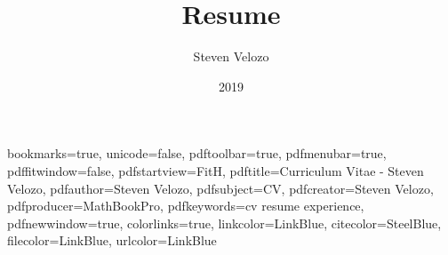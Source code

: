 
\usepackage{amsmath}

\usepackage{adjustbox}

\usepackage{graphicx}
\graphicspath{{graphics/}}

\title{Resume}
\author[Steven Velozo]{Steven Velozo}
\date{2019}
\newcommand{\displayaddress}{\marginnote[0.9cm]{\raggedleft{\href{mailto:steven@velozo.com}{steven@velozo.com}\\(206) 604-4981 }}}
\usepackage[english]{babel}
\usepackage{booktabs}
\usepackage{units}
\usepackage{fancyvrb}

\usepackage{multicol}

\usepackage{rotating}
\usepackage{tikz}
\usetikzlibrary{arrows,backgrounds,snakes}


\newcommand{\mhstandout}[1]{\textbf{\textcolor{DarkGray}{#1}}}
\newcommand{\shstandout}[1]{\textbf{\textcolor{BurntOrange}{#1}}}
\newcommand{\shyears}[1]{\small{\texttt{\textcolor{LightGray}{#1}}}}
\newcommand{\pstandout}[1]{\textcolor{BrightRed}{#1}}
\newcommand{\competency}[1]{\textcolor{BrightRed}{#1}}

\hypersetup
{
    bookmarks=true,         %
    unicode=false,          %
    pdftoolbar=true,        %
    pdfmenubar=true,        %
    pdffitwindow=false,     %
    pdfstartview={FitH},    %
    pdftitle={Curriculum Vitae - Steven Velozo},    %
    pdfauthor={Steven Velozo},     %
    pdfsubject={CV},   %
    pdfcreator={Steven Velozo},   %
    pdfproducer={MathBookPro}, %
    pdfkeywords={cv} {resume} {experience}, %
    pdfnewwindow=true,      %
    colorlinks=true,       %
    linkcolor=LinkBlue,          %
    citecolor=SteelBlue,        %
    filecolor=LinkBlue,      %
    urlcolor=LinkBlue           %
}

